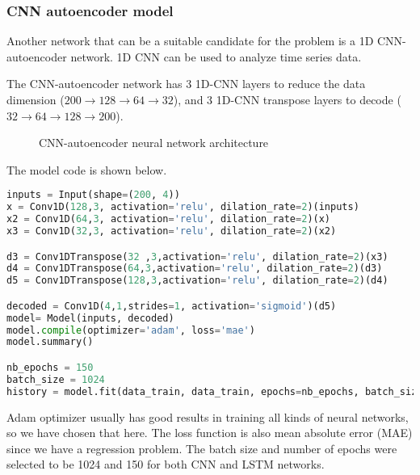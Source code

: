 \subsubsection*{CNN autoencoder model}

Another network that can be a suitable candidate for the problem is a 1D CNN-autoencoder network. 1D CNN can be used to analyze time series data. 

The CNN-autoencoder network has 3 1D-CNN layers to reduce the data dimension ($200\rightarrow128\rightarrow64\rightarrow32$), and 3 1D-CNN transpose layers to decode ($32\rightarrow64\rightarrow128\rightarrow200$). 

\begin{figure}[H]
\centering
{}
\caption{CNN-autoencoder neural network architecture}
\end{figure}

The model code is shown below. 

\begin{center}{\begin{minipage}{0.9\linewidth}
\begin{lstlisting}[language=Python, basicstyle=\fontsize{10}{10}\selectfont\ttfamily]
inputs = Input(shape=(200, 4))
x = Conv1D(128,3, activation='relu', dilation_rate=2)(inputs)
x2 = Conv1D(64,3, activation='relu', dilation_rate=2)(x)
x3 = Conv1D(32,3, activation='relu', dilation_rate=2)(x2)

d3 = Conv1DTranspose(32 ,3,activation='relu', dilation_rate=2)(x3)
d4 = Conv1DTranspose(64,3,activation='relu', dilation_rate=2)(d3)
d5 = Conv1DTranspose(128,3,activation='relu', dilation_rate=2)(d4)

decoded = Conv1D(4,1,strides=1, activation='sigmoid')(d5)
model= Model(inputs, decoded)
model.compile(optimizer='adam', loss='mae')
model.summary()

nb_epochs = 150
batch_size = 1024
history = model.fit(data_train, data_train, epochs=nb_epochs, batch_size=batch_size, validation_split=0.05).history
\end{lstlisting}
\end{minipage}}\end{center}

Adam optimizer usually has good results in training all kinds of neural networks, so we have chosen that here. The loss function is also mean absolute error (MAE) since we have a regression problem.
The batch size and number of epochs were selected to be 1024 and 150 for both CNN and LSTM networks.

